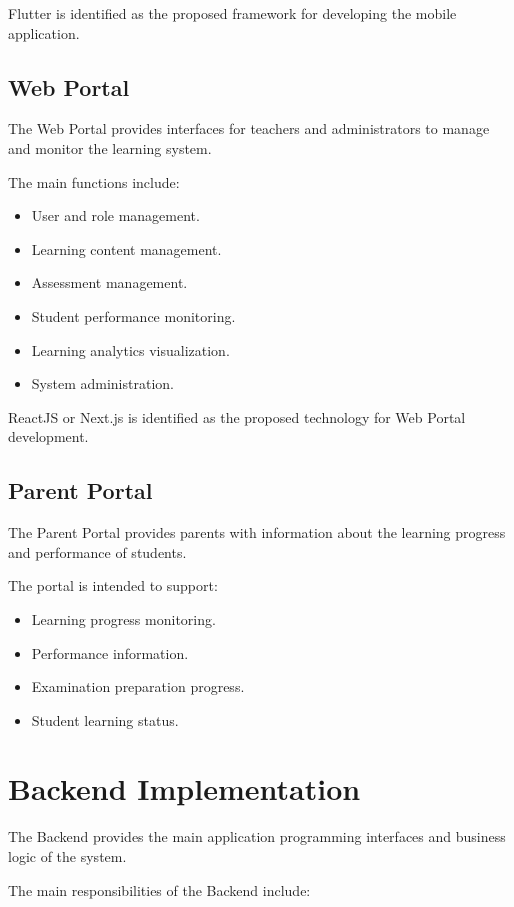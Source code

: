 Flutter is identified as the proposed framework for developing the mobile application.

\subsection{Web Portal}

The Web Portal provides interfaces for teachers and administrators to manage and monitor the learning system.

The main functions include:

\begin{itemize}
	\item User and role management.
	\item Learning content management.
	\item Assessment management.
	\item Student performance monitoring.
	\item Learning analytics visualization.
	\item System administration.
\end{itemize}

ReactJS or Next.js is identified as the proposed technology for Web Portal development.

\subsection{Parent Portal}

The Parent Portal provides parents with information about the learning progress and performance of students.

The portal is intended to support:

\begin{itemize}
	\item Learning progress monitoring.
	\item Performance information.
	\item Examination preparation progress.
	\item Student learning status.
\end{itemize}

\section{Backend Implementation}

The Backend provides the main application programming interfaces and business logic of the system.

The main responsibilities of the Backend include:

